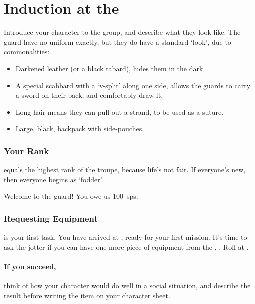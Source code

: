 \section[Induction at the \Glsfmttext{templeOfBeasts}]{Induction at the }
\label{ngIntroductions}

\begin{multicols}{2}

\noindent
Introduce your character to the group, and describe what they look like.
The \gls{guard} have no uniform exactly, but they do have a standard `look', due to commonalities:

\begin{itemize}
  \item
  Darkened leather (or a black tabard), hides them in the dark.
  \item
  A special scabbard with a `v-split' along one side, allows the \glspl{guard} to carry a sword on their back, and comfortably draw it.
  \item
  Long hair means they can pull out a strand, to be used as a suture.
  \item
  Large, black, backpack with side-pouches.
\end{itemize}

\subsubsection{Your Rank}
\label{ngRank}
equals the highest rank of the troupe, because life's not fair.
If everyone's new, then everyone begins as `\gls{fodder}'.

Welcome to the \gls{guard}!
You owe us 100~\glspl{sp}.

\subsubsection{Requesting Equipment}
is your first task.
You have arrived at , ready for your first mission.
It's time to ask the \gls{jotter} if you can have one more piece of equipment from the , .
Roll  at \tn[7].

\paragraph{If you succeed,}
think of how your character would do well in a social situation, and describe the result before writing the item on your character sheet.


\end{multicols}
